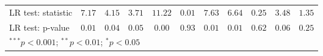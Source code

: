\begin{table}
\begin{center}
\begin{tabular}{l c c c c c c c c c c}
LR test: statistic                & $7.17$        & $4.15$        & $3.71$        & $11.22$       & $0.01$         & $7.63$        & $6.64$        & $0.25$        & $3.48$        & $1.35$         \\
LR test: p-value                  & $0.01$        & $0.04$        & $0.05$        & $0.00$        & $0.93$         & $0.01$        & $0.01$        & $0.62$        & $0.06$        & $0.25$         \\
\hline
\multicolumn{11}{l}{\scriptsize{$^{***}p<0.001$; $^{**}p<0.01$; $^{*}p<0.05$}}
\end{tabular}
\label{Tab:SCSAR_Estimates_G3_Phi025}
\end{center}
\end{table}
